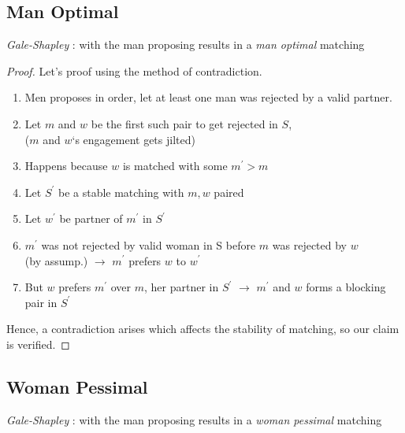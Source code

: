 \subsection{Man Optimal}

\begin{theorem}\label{thm_1_5}
    \textit{Gale-Shapley} : with the man proposing results in a \textit{man optimal} matching
\end{theorem}

\begin{proof}
Let's proof using the method of contradiction.
    \begin{enumerate}
    \item Men proposes in order, let at least one man was rejected by a valid partner.
    \item Let $m$ and $w$ be the first such pair to get rejected in $S$, \\ ($m$ and $w$`s engagement gets jilted)
    \item Happens because $w$ is matched with some $m^\prime > m$
    \item Let $S^\prime$ be a stable matching with $m, w$ paired
    \item Let $w^\prime$ be partner of $m^\prime$ in $S^\prime$
    \item $m^\prime$ was not rejected by valid woman in S before $m$ was rejected by $w$ \\ (by assump.) $\longrightarrow$ $m^\prime$  prefers $w$ to  $w^\prime$ 
    \item But $w$ prefers $m^\prime$ over $m$, her partner in $S^\prime$ $\longrightarrow$ $m^\prime$ and $w$ forms a blocking pair in $S^\prime$
\end{enumerate}
Hence, a contradiction arises which affects the stability of matching, so our claim is verified.\cite{The_SMP}
\end{proof}

\subsection{Woman Pessimal}

\begin{theorem}
    \textit{Gale-Shapley} : with the man proposing results in a \textit{woman pessimal} matching
\end{theorem}

